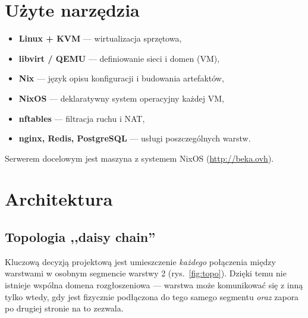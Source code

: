 \documentclass[11pt,a4paper]{article}
\begin{document}
\section{Użyte narzędzia}
\begin{itemize}[nosep]
  \item \textbf{Linux + KVM} --- wirtualizacja sprzętowa,
  \item \textbf{libvirt / QEMU} --- definiowanie sieci i domen (VM),
  \item \textbf{Nix} --- język opisu konfiguracji i budowania artefaktów,
  \item \textbf{NixOS} --- deklaratywny system operacyjny każdej VM,
  \item \textbf{nftables} --- filtracja ruchu i NAT,
  \item \textbf{nginx, Redis, PostgreSQL} --- usługi poszczególnych warstw.
\end{itemize}
Serwerem docelowym jest maszyna z systemem NixOS (\url{http://beka.ovh}).

\section{Architektura}

\subsection{Topologia ,,daisy chain''}
Kluczową decyzją projektową jest umieszczenie \emph{każdego} połączenia między
warstwami w osobnym segmencie warstwy 2 (rys.~\ref{fig:topo}). Dzięki temu nie
istnieje wspólna domena rozgłoszeniowa --- warstwa może komunikować się z inną
tylko wtedy, gdy jest fizycznie podłączona do tego samego segmentu \emph{oraz}
zapora po drugiej stronie na to zezwala.
\end{document}
